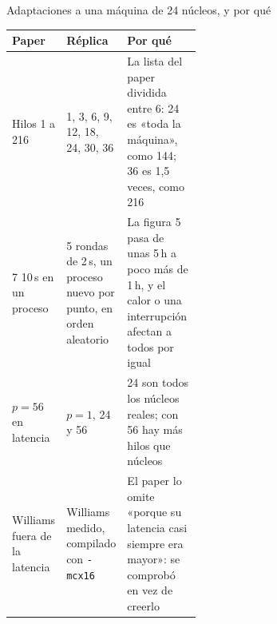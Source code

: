 \begin{frame}{Adaptaciones a una máquina de 24 núcleos, y por qué}
  \footnotesize\renewcommand{\arraystretch}{1.2}
  \begin{tabularx}{\linewidth}{@{}p{0.2\linewidth}p{0.27\linewidth}X@{}}
    \toprule
    \textbf{Paper} & \textbf{Réplica} & \textbf{Por qué}\\
    \midrule
    Hilos 1 a 216 & 1, 3, 6, 9, 12, 18, 24, 30, 36 & La lista del paper dividida entre 6: 24 es «toda la máquina», como 144; 36 es 1,5 veces, como 216\\
    7 \por{} 10\,s en un proceso & 5 rondas de 2\,s, un proceso nuevo por punto, en orden aleatorio & La figura 5 pasa de unas 5\,h a poco más de 1\,h, y el calor o una interrupción afectan a todos por igual\\
    $p = 56$ en latencia & $p = 1$, 24 y 56 & 24 son todos los núcleos reales; con 56 hay más hilos que núcleos\\
    Williams fuera de la latencia & Williams medido, compilado con \texttt{-mcx16} & El paper lo omite «porque su latencia casi siempre era mayor»: se comprobó en vez de creerlo\\
    \bottomrule
  \end{tabularx}
  \vfill
\end{frame}

